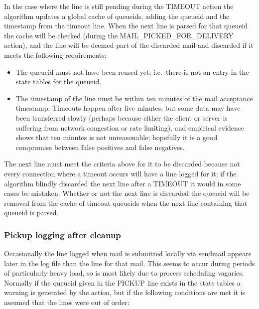 In the case where the  line is still pending during the
TIMEOUT action the algorithm updates a global cache of queueids, adding the
queueid and the timestamp from the timeout line.  When the next
 line is parsed for that queueid the cache will be checked
(during the MAIL\_PICKED\_FOR\_DELIVERY action),
and the line will be deemed part of the discarded mail and discarded if it
meets the following requirements:

\begin{itemize}

    \item The queueid must not have been reused yet, i.e.\ there is not an
        entry in the state tables for the queueid.

    \item The timestamp of the  line must be within ten
        minutes of the mail acceptance timestamp.  Timeouts happen after
        five minutes, but some data may have been transferred slowly
        (perhaps because either the client or server is suffering from
        network congestion or rate limiting), and empirical evidence shows
        that ten minutes is not unreasonable; hopefully it is a good
        compromise between false positives and false negatives.

\end{itemize}

The next  line must meet the criteria above for it to be
discarded because not every connection where a timeout occurs will have a
 line logged for it; if the algorithm blindly discarded the
next  line after a TIMEOUT it would in some cases be
mistaken.  Whether or not the next  line is discarded the
queueid will be removed from the cache of timeout queueids when the next
 line containing that queueid is parsed.

\subsubsection{Pickup logging after cleanup}

\label{pickup logging after cleanup}

Occasionally the  line logged when mail is submitted locally
via sendmail appears later in the log file than the  line
for that mail.  This seems to occur during periods of particularly heavy
load, so is most likely due to process scheduling vagaries.  Normally if
the queueid given in the PICKUP line exists in the state tables a warning
is generated by the  action, but if the following conditions
are met it is assumed that the lines were out of order:

